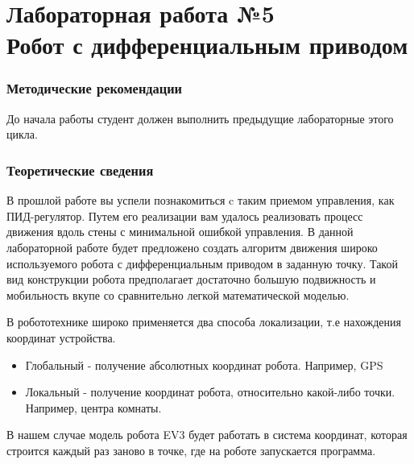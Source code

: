 \documentclass[12pt,a4paper,openany]{extarticle}
\begin{document}
\part*{Лабораторная работа №5\\
Робот с дифференциальным приводом}

\section{Методические рекомендации}
\hspace*{\parindent}До начала работы студент должен выполнить предыдущие лабораторные этого цикла.

\section{Теоретические сведения}
\hspace*{\parindent}В прошлой работе вы успели познакомиться c таким приемом управления, как ПИД-регулятор. Путем его реализации вам удалось реализовать процесс движения вдоль стены с минимальной ошибкой управления. В данной лабораторной работе будет предложено создать алгоритм движения широко используемого робота с дифференциальным приводом в заданную точку. Такой вид конструкции робота предполагает достаточно большую подвижность и мобильность вкупе со сравнительно легкой математической моделью. 

В робототехнике широко применяется два способа локализации, т.е нахождения координат устройства.

\begin{itemize}
\item Глобальный - получение абсолютных координат робота. Например, GPS
\item Локальный - получение координат робота, относительно какой-либо точки. Например, центра комнаты.
\end{itemize}

В нашем случае модель робота EV3 будет работать в система координат, которая строится каждый раз заново в точке, где на роботе запускается программа.
\end{document}
